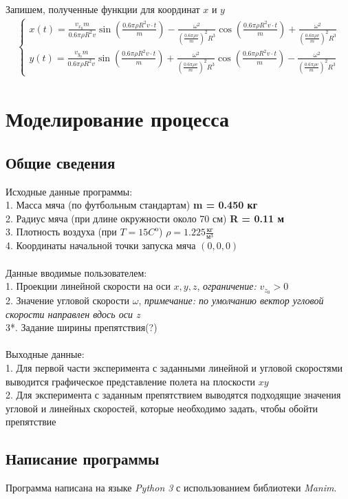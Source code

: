 \documentclass[a5paper, 10pt]{article}
\theoremstyle{definition}
\theoremstyle{plain}
\theoremstyle{remark}
\begin{document}
Запишем, полученные функции для координат $x$ и $y$
\begin{multline}
\begin{cases}
x(t) = \frac{ v_{x_0} m }{0.6 \pi \rho  R^{2} v} \sin \left(\frac{0.6 \pi \rho  R^{2} v \cdot t}{m} \right) -\frac{ \omega^2}{\left( \frac{0.6 \pi \rho v}{m}\right)^2  R^3} \cos \left(\frac{0.6 \pi \rho  R^{2} v \cdot t}{m} \right) + \frac{ \omega^2}{\left( \frac{0.6 \pi \rho v}{m}\right)^2  R^3}\\
y(t) = \frac{ v_{y_0} m }{0.6 \pi \rho  R^{2} v} \sin \left(\frac{0.6 \pi \rho  R^{2} v \cdot t}{m} \right) + \frac{ \omega^2}{\left( \frac{0.6 \pi \rho v}{m}\right)^2  R^3} \cos \left(\frac{0.6 \pi \rho  R^{2} v \cdot t}{m} \right) - \frac{ \omega^2}{\left( \frac{0.6 \pi \rho v}{m}\right)^2  R^3}
\end{cases}
\end{multline}


\section{Моделирование процесса}
\subsection{Общие сведения}
Исходные данные программы:\\
1. Масса мяча (по футбольным стандартам) \textbf{m = 0.450 кг}\\
2. Радиус мяча (при длине окружности около 70 см)  \textbf{R = 0.11 м}\\
3. Плотность воздуха (при $T = 15 C^{\text{o}}$) $\rho = 1.225 \frac{\text{кг}}{\text{м}^3}$\\
4. Координаты начальной точки запуска мяча $(0, 0, 0)$\\\\
Данные вводимые пользователем:\\
1. Проекции линейной скорости на оси $x, y, z$, \textit{ограничение: }  $v_{z_{0}} > 0$\\
2. Значение угловой скорости $\omega$, \textit{ примечание: по умолчанию вектор угловой скорости направлен вдось оси z }\\
3*. Задание ширины препятствия(?)\\\\
Выходные данные:\\
1. Для первой части эксперимента с заданными линейной и угловой скоростями выводится графическое представление полета на плоскости $xy$\\
2. Для эксперимента с заданным препятствием выводятся подходящие значения угловой и линейных скоростей, которые необходимо задать, чтобы обойти препятствие\\


\subsection{Написание программы}
Программа написана на языке \textit{Python 3} с использованием библиотеки \textit{Manim}.
\end{document}

